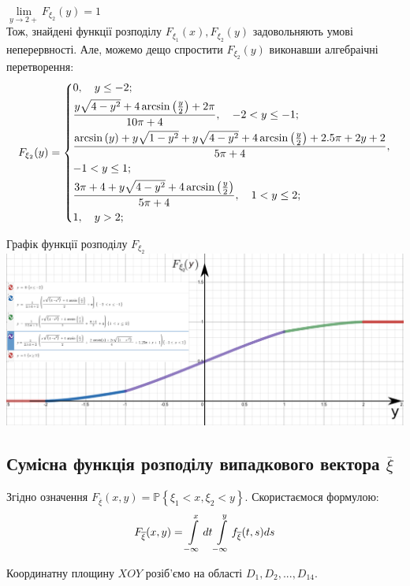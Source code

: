 \documentclass[14pt,a4paper]{scrartcl}
\theoremstyle{definition}
\theoremstyle{remark}
\theoremstyle{definition}
\theoremstyle{definition}
\begin{document}
$\lim\limits_{y\to  2+}{ F_{\xi_2}(y)} = 1$\\
Тож, знайдені функції розподілу $F_{\xi_1}(x), F_{\xi_2}(y)$ задовольняють умові неперервності. Але, можемо дещо спростити $ F_{\xi_2}(y)$ виконавши алгебраічні перетворення:
\vfill
$$
F_{\xi_2} (y) = \begin{dcases}
	0, \quad y \leq  -2;\\
 \dfrac{y\sqrt{4-y^2}+4\arcsin\left(\frac{y}{2}\right) + 2{\pi}}{10\pi + 4} , \quad -2 < y \leq -1;\\
 \dfrac{\arcsin\left(y\right)+y\sqrt{1-y^2}+ y\sqrt{4-y^2}+4\arcsin\left(\frac{y}{2}\right) + 2.5\pi + 2y + 2}{5\pi + 4}   ,\\  -1 < y \leq 1; \\
		 	 \dfrac{3\pi + 4 +y\sqrt{4-y^2}+4\arcsin\left(\frac{y}{2}\right)}{5\pi + 4} , \quad 1 < y \leq 2;\\
		1, \quad y >  2;\\
\end{dcases}
$$
\vfill
\begin{center}{\large Графік функції розподілу $F_{\xi_2}$}\\
\includegraphics[scale=0.4]{assets/Fx4556.png} \end{center}

\newpage

\subsection{Сумісна функція розподілу випадкового вектора $\overline{\xi}$
}
Згідно означення $F_{\overline{\xi}}(x,y) = \mathbb{P} \left\lbrace \xi_1 < x, \xi_2 < y \right\rbrace$.
Скористаємося формулою:
$$
F_{\overline{\xi}} (x,y )  =  \int\limits_{-\infty}^{ x}{ dt  \int\limits_{-\infty}^{ y}{ f_{\overline{\xi}} (t,s) ds}}
$$

Координатну площину $XOY$ розіб’ємо на області $D_1, D_2,..., D_{14}$.
\end{document}
